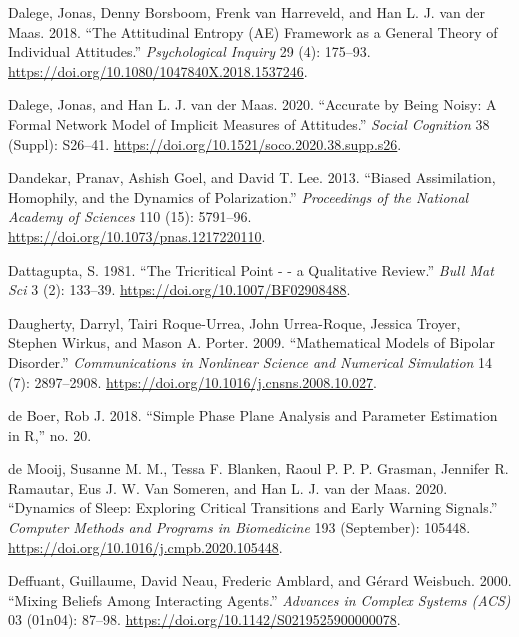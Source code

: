 \documentclass[
  letterpaper,
]{scrbook}
\newlength{\cslhangindent}
\newlength{\cslentryspacingunit} %
\newenvironment{CSLReferences}[2] %
 {%
  \setlength{\parindent}{0pt}
  \ifodd #1
  \let\oldpar\par
  \def\par{\hangindent=\cslhangindent\oldpar}
  \fi
  \setlength{\parskip}{#2\cslentryspacingunit}
 }%
 {}
\begin{document}
\begin{CSLReferences}{1}{0}
\leavevmode{}%
Dalege, Jonas, Denny Borsboom, Frenk van Harreveld, and Han L. J. van
der Maas. 2018. {``The {Attitudinal Entropy} ({AE}) Framework as a
General Theory of Individual Attitudes.''} \emph{Psychological Inquiry}
29 (4): 175--93. \url{https://doi.org/10.1080/1047840X.2018.1537246}.

\leavevmode{}%
Dalege, Jonas, and Han L. J. van der Maas. 2020. {``Accurate by Being
Noisy: {A} Formal Network Model of Implicit Measures of Attitudes.''}
\emph{Social Cognition} 38 (Suppl): S26--41.
\url{https://doi.org/10.1521/soco.2020.38.supp.s26}.

\leavevmode{}%
Dandekar, Pranav, Ashish Goel, and David T. Lee. 2013. {``Biased
Assimilation, Homophily, and the Dynamics of Polarization.''}
\emph{Proceedings of the National Academy of Sciences} 110 (15):
5791--96. \url{https://doi.org/10.1073/pnas.1217220110}.

\leavevmode{}%
Dattagupta, S. 1981. {``The Tricritical Point - - a Qualitative
Review.''} \emph{Bull Mat Sci} 3 (2): 133--39.
\url{https://doi.org/10.1007/BF02908488}.

\leavevmode{}%
Daugherty, Darryl, Tairi Roque-Urrea, John Urrea-Roque, Jessica Troyer,
Stephen Wirkus, and Mason A. Porter. 2009. {``Mathematical Models of
Bipolar Disorder.''} \emph{Communications in Nonlinear Science and
Numerical Simulation} 14 (7): 2897--2908.
\url{https://doi.org/10.1016/j.cnsns.2008.10.027}.

\leavevmode{}%
de Boer, Rob J. 2018. {``Simple Phase Plane Analysis and Parameter
Estimation in {R},''} no. 20.

\leavevmode{}%
de Mooij, Susanne M. M., Tessa F. Blanken, Raoul P. P. P. Grasman,
Jennifer R. Ramautar, Eus J. W. Van Someren, and Han L. J. van der Maas.
2020. {``Dynamics of Sleep: {Exploring} Critical Transitions and Early
Warning Signals.''} \emph{Computer Methods and Programs in Biomedicine}
193 (September): 105448.
\url{https://doi.org/10.1016/j.cmpb.2020.105448}.

\leavevmode{}%
Deffuant, Guillaume, David Neau, Frederic Amblard, and Gérard Weisbuch.
2000. {``Mixing Beliefs Among Interacting Agents.''} \emph{Advances in
Complex Systems (ACS)} 03 (01n04): 87--98.
\url{https://doi.org/10.1142/S0219525900000078}.


\end{CSLReferences}
\end{document}
